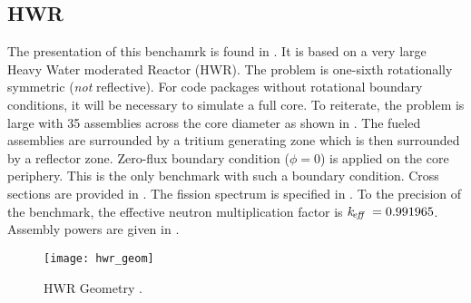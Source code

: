     \restoregeometry
    \pagestyle{plain}
    \thispagestyle{plain}
  \subsection{HWR}
    \label{sec:hwr}
    The presentation of this benchamrk is found in \cite{chao}. It is based on a
    very large Heavy Water moderated Reactor (HWR).  The problem is
    one-sixth rotationally symmetric (\textit{not} reflective). For code
    packages without rotational boundary conditions, it will be necessary to
    simulate a full core. To reiterate, the problem is large with 35 assemblies
    across the core diameter as shown in . The fueled
    assemblies are surrounded by a tritium generating zone which is then 
    surrounded by a reflector zone. Zero-flux boundary condition ($\phi = 0$) is
    applied on the core periphery. This is the only benchmark with such a
    boundary condition. Cross sections are provided in
    . The fission spectrum is specified in . To
    the precision of the benchmark, the effective neutron multiplication factor
    is $k_{\!\mbox{\scriptsize \em eff}}\  = 0.991965$. Assembly powers are given in .
    \begin{figure}
      \centering
      \texttt{[image: hwr\_geom]}
      \caption{HWR Geometry \cite{chao}.}
      \label{fig:hwr_geom}
    \end{figure}
